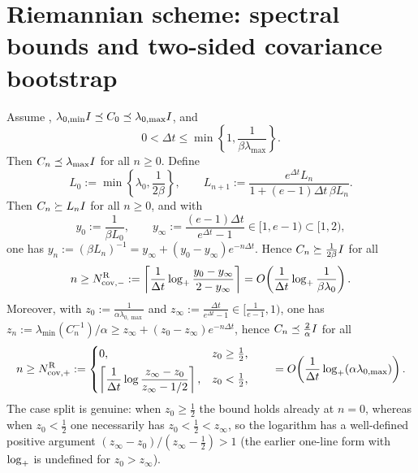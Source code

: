 \section{Riemannian scheme: spectral bounds and two-sided covariance bootstrap}

\begin{lemma}
\label{lem:Riem-cov}
Assume , $\lambda_{0,\min}I\preceq C_0\preceq\lambda_{0,\max}I$,
and
\[
    0<\Delta t\leq\min\left\{1,\frac1{\beta\lambda_{\max}}\right\}.
\]
Then $C_n\preceq\lambda_{\max}I$ for all $n\geq0$. Define
\[
    L_0:=\min\left\{\lambda_0,\frac1{2\beta}\right\},
    \qquad
    L_{n+1}:=\frac{e^{\Delta t}L_n}{1+(e-1)\Delta t\,\beta L_n}.
\]
Then $C_n\succeq L_nI$ for all $n\geq0$, and with
\[
    y_0:=\frac1{\beta L_0},
    \qquad
    y_\infty:=\frac{(e-1)\Delta t}{e^{\Delta t}-1}\in[1,e-1)\subset[1,2),
\]
one has $y_n:=(\beta L_n)^{-1}=y_\infty+(y_0-y_\infty)e^{-n\Delta t}$. Hence
$C_n\succeq\tfrac1{2\beta}I$ for all
\[
    n\geq
    N_{\mathrm{cov},-}^{\mathrm{R}}
    :=
    \left\lceil
        \frac1{\Delta t}
        \log_+\frac{y_0-y_\infty}{2-y_\infty}
    \right\rceil
    =
    O\!\left(\frac1{\Delta t}\log_+\frac1{\beta\lambda_0}\right).
\]
Moreover, with $z_0:=\tfrac1{\alpha\lambda_{0,\max}}$ and
$z_\infty:=\tfrac{\Delta t}{e^{\Delta t}-1}\in[\tfrac1{e-1},1)$, one has
$z_n:=\lambda_{\min}(C_n^{-1})/\alpha\geq z_\infty+(z_0-z_\infty)e^{-n\Delta t}$, hence
$C_n\preceq\tfrac2\alpha I$ for all
\[
    n\geq
    N_{\mathrm{cov},+}^{\mathrm{R}}
    :=
    \begin{cases}
        0, & z_0\geq\tfrac12,\\[4pt]
        \left\lceil
            \dfrac1{\Delta t}
            \log\dfrac{z_\infty-z_0}{z_\infty-1/2}
        \right\rceil, & z_0<\tfrac12,
    \end{cases}
    \qquad
    =
    O\!\left(\frac1{\Delta t}\log_+(\alpha\lambda_{0,\max})\right).
\]
The case split is genuine: when $z_0\geq\tfrac12$ the bound holds already at $n=0$, whereas
when $z_0<\tfrac12$ one necessarily has $z_0<\tfrac12<z_\infty$, so the logarithm has a
well-defined positive argument $(z_\infty-z_0)/(z_\infty-\tfrac12)>1$ (the earlier one-line
form with $\log_+$ is undefined for $z_0>z_\infty$).
\end{lemma}

